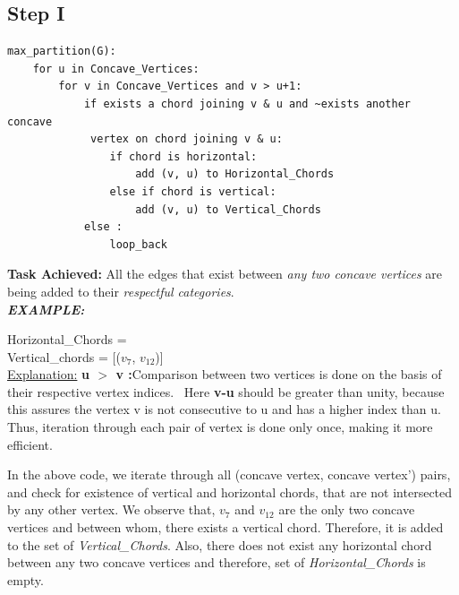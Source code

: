 \subsection{Step I}
\begin{lstlisting}
max_partition(G):
    for u in Concave_Vertices:
        for v in Concave_Vertices and v > u+1:
            if exists a chord joining v & u and ~exists another concave 
             vertex on chord joining v & u:
                if chord is horizontal: 
                    add (v, u) to Horizontal_Chords
                else if chord is vertical:
                    add (v, u) to Vertical_Chords
            else :
                loop_back
\end{lstlisting}
\textbf{Task Achieved:} All the edges that exist between \emph{any two concave vertices} are being added to their \emph{respectful categories}. \\
\textbf{\emph{EXAMPLE:}}\\
\begin{figure}[h]
  \centering
\end{figure}

Horizontal\_Chords = \phi \\
Vertical\_chords = [($v_7$, $v_{12}$)] \\
\underline{Explanation:}
\textbf{u $>$ v :}Comparison between two vertices is done on the basis of their respective vertex indices. \
Here \textbf{v-u} should be greater than unity, because this assures the vertex v is not consecutive to u and has a higher index than u. Thus, iteration through each pair of vertex is done only once, making it more efficient. 

In the above code, we iterate through all (concave vertex, concave vertex') pairs, and check for existence of vertical and horizontal chords, that are not intersected by any other vertex.
We observe that, $v_7$ and $v_{12}$ are the only two concave vertices and between whom, there exists a vertical chord. Therefore, it is added to the set of \emph{Vertical\_Chords}. Also, there does not exist any horizontal chord between any two concave vertices and therefore, set of \emph{Horizontal\_Chords} is empty. \\

